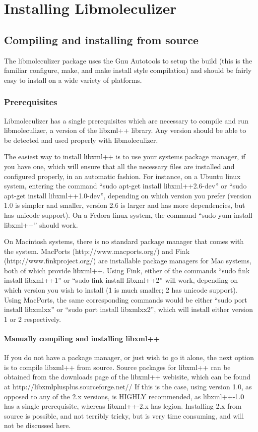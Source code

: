 \chapter{Installing Libmoleculizer}
\label{chap:installingChapter}

\section{Compiling and installing from source}
The libmoleculizer package uses the Gnu Autotools to setup the build
(this is the familiar configure, make, and make install style
compilation) and should be fairly easy to install on a wide variety of
platforms.

\subsection{Prerequisites}
Libmoleculizer has a single prerequisites which are necessary to compile and
run libmoleculizer, a version of the libxml++ library.   Any version
should be able to be detected and used properly with libmoleculizer.  

The easiest way to install libxml++ is to use your systems package
manager, if you have one, which will ensure that all the necessary
files are installed and configured properly, in an automatic fashion.
For instance, on a Ubuntu linux system, entering the command ``sudo
apt-get install libxml++2.6-dev'' or ``sudo apt-get install
libxml++1.0-dev'', depending on which version you prefer (version 1.0
is simpler and smaller, version 2.6 is larger and has more
dependencies, but has unicode support).  On a Fedora linux system, the
command ``sudo yum install libxml++'' should work.

On Macintosh systems, there is no standard package manager that comes
with the system.  MacPorts (http://www.macports.org/) and Fink
(http://www.finkproject.org/) are installable package managers for Mac
systems, both of which provide libxml++.  Using Fink, either of the
commands ``sudo fink install libxml++1'' or ``sudo fink install
libxml++2'' will work, depending on which version you wish to install
(1 is much smaller; 2 has unicode support).  Using MacPorts, the same
corresponding commands would be either ``sudo port install libxmlxx''
or ``sudo port install libxmlxx2'', which will install either version
1 or 2 respectively.


\subsubsection{Manually compiling and installing  libxml++}
If you do not have a package manager, or just wish to go it alone, the
next option is to compile libxml++ from source.  Source packages for
libxml++ can be obtained from the downloads page of the libxml++
webisite, which can be found at
http://libxmlplusplus.sourceforge.net//  If this is the case, 
using version 1.0, as opposed to any of the 2.x versions, is HIGHLY
recommended, as libxml++-1.0 has a single prerequisite, whereas
libxml++-2.x has legion. Installing 2.x from source is possible, and
not terribly tricky, but is very time consuming, and will not be
discussed here.


